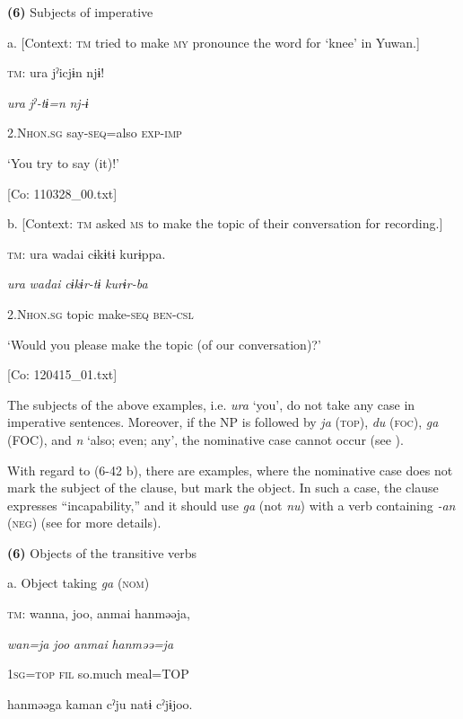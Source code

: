 \textbf{(6)}  Subjects of imperative

  a.  [Context: \textsc{tm} tried to make \textsc{my} pronounce the word for ‘knee’ in Yuwan.]

    \textsc{tm}:  ura  jˀicjɨn  njɨ!

      \textit{ura}  \textit{jˀ-tɨ=n}  \textit{nj-ɨ}

      2.N\textsc{hon}.\textsc{sg}  say-\textsc{seq}=also  \textsc{exp}-\textsc{imp}

      ‘You try to say (it)!’

      [Co: 110328\_00.txt]

  b.  [Context: \textsc{tm} asked \textsc{ms} to make the topic of their conversation for recording.]

    \textsc{tm}:  ura  {\textbar}wadai{\textbar}  cɨkɨtɨ  kurɨppa.

      \textit{ura}  \textit{wadai}  \textit{cɨkɨr-tɨ}  \textit{kurɨr-ba}

      2.N\textsc{hon}.\textsc{sg}  topic  make-\textsc{seq}  \textsc{ben}-\textsc{csl}

      ‘Would you please make the topic (of our conversation)?’

      [Co: 120415\_01.txt]

The subjects of the above examples, i.e. \textit{ura} ‘you’, do not take any case in imperative sentences. Moreover, if the NP is followed by \textit{ja} (\textsc{top}), \textit{du} (\textsc{foc}), \textit{ga} (FOC), and \textit{n} ‘also; even; any’, the nominative case cannot occur (see ).

  With regard to (6-42 b), there are examples, where the nominative case does not mark the subject of the clause, but mark the object. In such a case, the clause expresses “incapability,” and it should use \textit{ga} (not \textit{nu}) with a verb containing \textit{{}-an} (\textsc{neg}) (see  for more details).

\textbf{(6)}  Objects of the transitive verbs

  a.  Object taking \textit{ga} (\textsc{nom})

    \textsc{tm}:  wanna,  joo,  anmai  hanməəja,

      \textit{wan=ja}  \textit{joo}  \textit{anmai}  \textit{hanməə=ja}

      1\textsc{sg}=\textsc{top}  \textsc{fil}  so.much  meal=TOP

      hanməəga  kaman  cˀju  natɨ  cˀjɨjoo.

